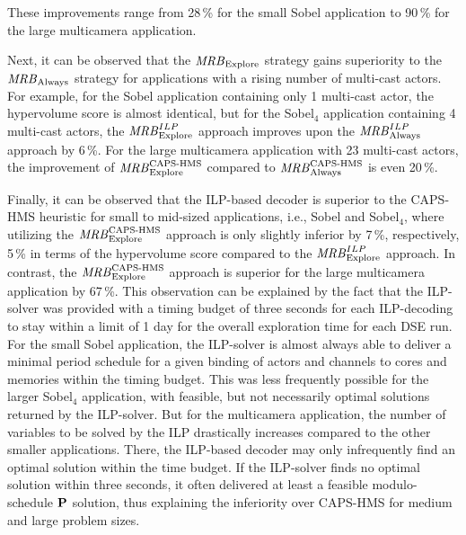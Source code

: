 These improvements range from 28\,\% for the small Sobel application to 90\,\% for the large multicamera application.
\par
Next, it can be observed that the ${\it MRB}_{\mathrm{Explore}}$ strategy gains superiority to the ${\it MRB}_{\mathrm{Always}}$ strategy for applications with a rising number of multi-cast actors. 
For example, for the Sobel application containing only 1 multi-cast actor, the hypervolume score is almost identical, but for the Sobel$_4$ application containing 4 multi-cast actors, the ${\it MRB}_{\mathrm{Explore}}^{ILP}$ approach improves upon the ${\it MRB}_{\mathrm{Always}}^{ILP}$ approach by 6\,\%.
For the large multicamera application with 23 multi-cast actors, the improvement of ${\it MRB}_{\mathrm{Explore}}^{\textup{{CAPS-HMS}}}$ compared to ${\it MRB}_{\mathrm{Always}}^{\textup{{CAPS-HMS}}}$ is even 20\,\%.
\par
Finally, it can be observed that the \ac{ILP}-based decoder is superior to the \ac{CAPS-HMS} heuristic for small to mid-sized applications, i.e., Sobel and Sobel$_4$, where utilizing the  ${\it MRB}_{\mathrm{Explore}}^{\textup{{CAPS-HMS}}}$ approach is only slightly inferior by
7\,\%, respectively, 5\,\% in terms of the hypervolume score compared to the ${\it MRB}_{\mathrm{Explore}}^{ILP}$ approach.
In contrast, the ${\it MRB}_{\mathrm{Explore}}^{\textup{{CAPS-HMS}}}$ approach is superior for the large multicamera application by 67\,\%.
This observation can be explained by the fact that the \ac{ILP}-solver was provided with a timing budget of three seconds for each \ac{ILP}-decoding to stay within a limit of 1 day for the overall exploration time for each \ac{DSE} run.
For the small Sobel application, the \ac{ILP}-solver is almost always able to deliver a minimal period schedule for a given binding of actors and channels to cores and memories within the timing budget.
This was less frequently possible for the larger Sobel$_4$ application, with feasible, but not necessarily optimal solutions returned
by the \ac{ILP}-solver.
But for the multicamera application, the number of variables to be solved by the \ac{ILP} drastically increases compared to the other smaller applications.
There, the \ac{ILP}-based decoder may only infrequently find an optimal solution within the time budget. %
If the \ac{ILP}-solver finds no optimal solution within three seconds, it often delivered at least a feasible modulo-schedule $\mathbf{P}$ solution, thus explaining the inferiority over \ac{CAPS-HMS} for medium and large problem sizes.
